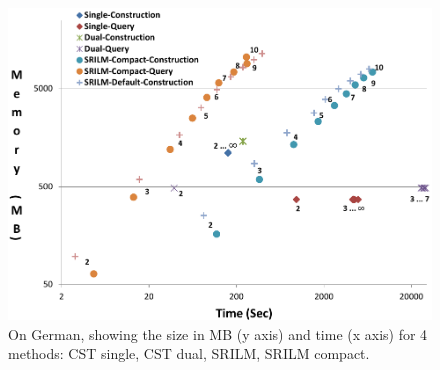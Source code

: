 \begin{figure}
\includegraphics[width=\columnwidth]{figures/Time-Space.pdf}
\caption{On German, showing the size in MB (y axis) and time (x axis) for 4 methods: CST single, CST dual, SRILM, SRILM compact.}
\end{figure}\label{figure:time-space}








